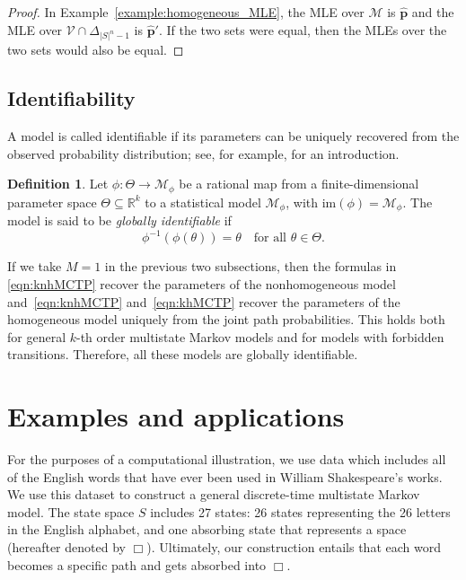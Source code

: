 \documentclass[11pt, a4paper]{article}
\numberwithin{equation}{section}
\theoremstyle{plain}
\theoremstyle{definition}
\newtheorem{definition}[theorem]{Definition}
\renewcommand{\emph}[1]{\textit{#1}}
\begin{document}
\begin{proof}
In Example~\ref{example:homogeneous_MLE}, the MLE over $\mathcal{M}$ is $\hat{\textbf{p}}$ and the MLE over $\mathcal{V} \cap \Delta_{|S|^n-1}$ is $\hat{\textbf{p}}'$. If the two sets were equal, then the MLEs over the two sets would also be equal.
\end{proof}








\subsection{Identifiability}


A model is called identifiable if its parameters can be uniquely recovered from
the observed probability distribution; see, for example,
\cite[Chapter~16]{sullivant2023algebraic} for an introduction.

\begin{definition}
\label{def::TypesofID}
Let $\phi \colon \Theta \rightarrow \mathcal{M}_{\phi}$ be a rational map from a
finite-dimensional parameter space $\Theta \subseteq \mathbb{R}^k$ to a
statistical model $\mathcal{M}_{\phi}$, with $\mathrm{im}(\phi)=\mathcal{M}_{\phi}$.
The model is said to be \emph{globally identifiable} if
\[
\phi^{-1}(\phi(\theta))=\theta
\quad\text{for all }\theta\in\Theta.
\]
\end{definition}
If we take $M=1$ in the previous two subsections, then the formulas
in \eqref{eqn:knhMCTP} recover the parameters of the nonhomogeneous model and~\eqref{eqn:knhMCTP} and~\eqref{eqn:khMCTP} recover the parameters of the homogeneous model uniquely from
the joint path probabilities.
This holds both for general $k$-th order multistate Markov models and for
models with forbidden transitions.
Therefore, all these models are globally identifiable.






\section{Examples and applications }\label{sec:applications} 

For the purposes of a computational illustration, we use data  which includes all of the English words that have ever been used in William Shakespeare’s works. We use this dataset to construct a general  discrete-time multistate Markov  model. The state space $S$ includes 27 states: 26 states representing the 26 letters in the English alphabet, and one absorbing state that represents a space (hereafter denoted by $\mathcal\Box$).
 Ultimately, our construction entails that each word becomes a specific path and gets absorbed into $\mathcal\Box$. 
\end{document}
